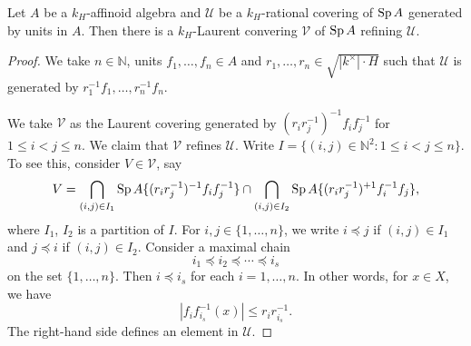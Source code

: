 \begin{lemma}\label{lma-prooftatelma3}
    Let $A$ be a $k_H$-affinoid algebra and $\mathcal{U}$ be a $k_H$-rational covering of $\operatorname{Sp} A$ generated by units in $A$. Then there is a $k_H$-Laurent convering $\mathcal{V}$ of $\operatorname{Sp} A$ refining $\mathcal{U}$.
\end{lemma}
\begin{proof}
    We take $n\in \mathbb{N}$, units $f_1,\ldots,f_n\in A$ and $r_1,\ldots,r_n\in \sqrt{|k^{\times}|\cdot H}$ such that $\mathcal{U}$ is generated by $r_1^{-1}f_1,\ldots,r_n^{-1}f_n$.

    We take $\mathcal{V}$ as the Laurent covering generated by $(r_i r_j^{-1})^{-1} f_if_j^{-1}$ for $1\leq i<j\leq n$. We claim that $\mathcal{V}$ refines $\mathcal{U}$. 
    Write $I=\{(i,j)\in \mathbb{N}^2:1\leq i<j\leq n\}$.
    To see this, consider $V\in \mathcal{V}$, say
    \[
        V=\bigcap_{(i,j)\in I_1} \operatorname{Sp} A\{ (r_i r_j^{-1})^{-1} f_if_j^{-1}\}\cap \bigcap_{(i,j)\in I_2} \operatorname{Sp} A\{ (r_i r_j^{-1})^{+1} f_i^{-1}f_j\},   
    \]
    where $I_1$, $I_2$ is a partition of $I$. For $i,j\in \{1,\ldots,n\}$, we write $i\preceq j$ if $(i,j)\in I_1$ and $j\preceq i$ if $(i,j)\in I_2$. Consider a maximal chain
    \[
        i_1\preceq i_2\preceq\cdots\preceq i_s
    \]
    on the set $\{1,\ldots,n\}$. Then $i\preceq i_s$ for each $i=1,\ldots,n$. 
    In other words, for $x\in X$, we have
    \[
        |f_if_{i_s}^{-1}(x)|\leq r_i r_{i_s}^{-1}.
    \]
    The right-hand side defines an element in $\mathcal{U}$.
\end{proof}




